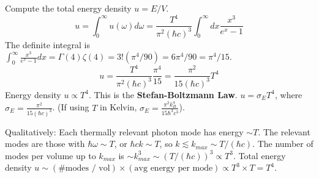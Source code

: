 \documentclass[11pt]{article}
\newcommand{\kb}{k_B} %
\begin{document}
Compute the total energy density $u = E/V$.
\[ u = \int_0^\infty u(\omega) d\omega = \frac{T^4}{\pi^2 (\hbar c)^3} \int_0^\infty dx \frac{x^3}{e^x - 1} \]
The definite integral is $\int_0^\infty \frac{x^3}{e^x-1} dx = \Gamma(4)\zeta(4) = 3! (\pi^4/90) = 6\pi^4/90 = \pi^4/15$.
\[ u = \frac{T^4}{\pi^2 (\hbar c)^3} \frac{\pi^4}{15} = \frac{\pi^2}{15 (\hbar c)^3} T^4 \]
Energy density $u \propto T^4$. This is the \textbf{Stefan-Boltzmann Law}.
$u = \sigma_E T^4$, where $\sigma_E = \frac{\pi^2}{15 (\hbar c)^3}$. (If using $T$ in Kelvin, $\sigma_E = \frac{\pi^2 \kb^4}{15 \hbar^3 c^3}$).

Qualitatively: Each thermally relevant photon mode has energy $\sim T$. The relevant modes are those with $\hbar\omega \sim T$, or $\hbar c k \sim T$, so $k \lesssim k_{max} \sim T/(\hbar c)$. The number of modes per volume up to $k_{max}$ is $\sim k_{max}^3 \sim (T/(\hbar c))^3 \propto T^3$.
Total energy density $u \sim (\text{\# modes / vol}) \times (\text{avg energy per mode}) \propto T^3 \times T = T^4$.
\end{document}
